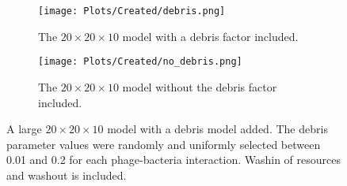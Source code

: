 \begin{figure}
    \centering
    \begin{subfigure}{1\linewidth}
        \centering
        \texttt{[image: Plots/Created/debris.png]}
        \caption{
            The $20\times20\times10$ model with a debris factor included. 
        }
        \label{fig:created:debris_model}
    \end{subfigure}
    \hfill
    \begin{subfigure}{1\linewidth}
        \centering
        \texttt{[image: Plots/Created/no\_debris.png]}
        \caption{
            The $20\times20\times10$ model without the debris factor included. 
        }
        \label{fig:created:no_debris_model}
    \end{subfigure}
    \caption{
        A large $20\times20\times10$ model with a debris model added. 
        The debris parameter values were randomly and uniformly selected between 0.01 and 0.2 for each phage-bacteria interaction. 
        Washin of resources and washout is included. 
    }
    \label{fig:created:debris}
\end{figure}